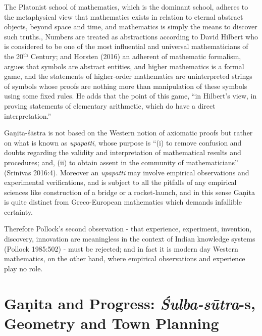The Platonist school of mathematics, which is the dominant school, adheres to the metaphysical view that mathematics exists in relation to eternal abstract objects, beyond space and time, and mathematics is simply the means to discover such truths., Numbers are treated as abstractions according to David Hilbert who is considered to be one of the most influential and universal mathematicians of the 20$^{\text{th}}$ Century; and Horsten (2016) an adherent of mathematic formalism, argues that symbols are abstract entities, and higher mathematics is a formal game, and the statements of higher-order mathematics are uninterpreted strings of symbols whose proofs are nothing more than manipulation of these symbols using some fixed rules. He adds that the point of this game, “in Hilbert's view, in proving statements of elementary arithmetic, which do have a direct interpretation.”

Gaṇita-śāstra is not based on the Western notion of axiomatic proofs but rather on what is known as {\sl upapatti}, whose purpose is ``(i) to remove confusion and doubts regarding the validity and interpretation of mathematical results and procedures; and, (ii) to obtain assent in the community of mathematicians'' (Srinivas 2016:4). Moreover an {\sl upapatti} may involve empirical observations and experimental verifications, and is subject to all the pitfalls of any empirical sciences like construction of a bridge or a rocket-launch, and in this sense Gaṇita is quite distinct from Greco-European mathematics which demands infallible certainty.

Therefore Pollock's second observation - that experience, experiment, invention, discovery, innovation are meaningless in the context of Indian knowledge systems (Pollock 1985:502) - must be rejected; and in fact it is modern day Western mathematics, on the other hand, where empirical observations and experience play no role.

\section*{Gaṇita and Progress: {\sl\bfseries Śulba-sūtra}-s, Geometry and Town Planning}

